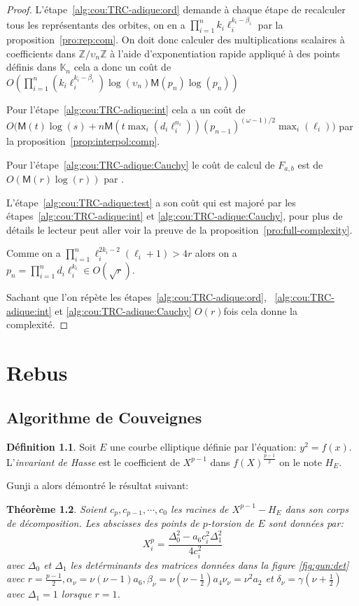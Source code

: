 \documentclass[10pt,a4paper]{book}
\theoremstyle{plain}
\newtheorem{thm}{Théorème}[chapter]
\theoremstyle{definition}
\theoremstyle{definition}
\theoremstyle{definition}
\theoremstyle{definition}
\newtheorem{defi}[thm]{Définition}
\theoremstyle{remark}
\theoremstyle{remark}
\theoremstyle{definition}
\begin{document}
\begin{proof}
L'étape~\ref{alg:cou:TRC-adique:ord} demande à chaque étape de recalculer tous les 
représentants des orbites, on en a $\prod_{i=1}^n k_i\ell_i^{k_i-\beta_i}$ par
la proposition~\ref{pro:rep:com}. 
On doit donc calculer des multiplications scalaires à coefficients dans 
$\mathbb{Z}/\upsilon_n \mathbb{Z}$ à l'aide d'exponentiation rapide appliqué à
des points définis dans $\mathbb{K}_n$ cela a donc un coût de 
$O(\prod_{i=1}^n (k_i\ell_i^{k_i-\beta_i})\log(\upsilon_n) \mathsf{M}(p_n)\log(p_n))$

Pour l'étape~\ref{alg:cou:TRC-adique:int} cela a un coût de 
$O\bigl(\mathsf{M}(t)\log(s) + n\mathsf{M}(t \max_i(d_i\ell_i^{n_i}))(p_{n-1})^{(\omega-1)/2} \max_{i}(\ell_{i})\bigr)$ 
 par la proposition~\ref{prop:interpol:comp}.

Pour l'étape~\ref{alg:cou:TRC-adique:Cauchy} le coût de calcul de $F_{a,b}$ est de 
$O(\mathsf{M}(r)\log(r))$ par \cite[Théorème 7.5]{algeff17}.

L'étape~\ref{alg:cou:TRC-adique:test} a son coût qui est majoré par les 
étapes~\ref{alg:cou:TRC-adique:int} et \ref{alg:cou:TRC-adique:Cauchy}, pour plus de 
détails le lecteur peut aller voir la preuve de la 
proposition~\ref{pro:full-complexity}.

Comme on a $\prod_{i=1}^n\ell_{i}^{2k_{i}-2}(\ell_{i}+1)>4r$ alors on a 
$p_n=\prod_{i=1}^nd_i\ell_i^{k_i} \in O(\sqrt{r})$. 

Sachant que l'on répète les étapes~\ref{alg:cou:TRC-adique:ord}, 
~\ref{alg:cou:TRC-adique:int} et \ref{alg:cou:TRC-adique:Cauchy}  $O(r)$fois cela donne la 
complexité.
\end{proof}

\chapter{Rebus}
\section{Algorithme de Couveignes}

\begin{defi}
Soit $E$ une courbe elliptique définie par l'équation: $y^2=f(x)$. L'\emph{invariant de Hasse} est le coefficient de $X^{p-1}$ dans $f(X)^{\frac{p-1}{2}}$ on le note $H_{E}$.
\end{defi}

Gunji a alors démontré le résultat suivant:

\begin{thm}
\label{thm:Gunji}
Soient $c_p, c_{p-1}, \cdots, c_{0}$ les racines de $X^{p-1}-H_{E}$ dans son corps de décomposition. Les abscisses des points de $p$-torsion de $E$ sont données par: 
\begin{equation*}
X^{p}_i=\frac{\Delta_0^2-a_6c_i^2\Delta_1^2}{4c_i^2}
\end{equation*}
avec $\Delta_0$ et $\Delta_1$ les detérminants des matrices données dans la figure \ref{fig:gun:det} avec $r=\frac{p-1}{2}, \alpha_{\nu}=\nu (\nu -1 ) a_6, \beta_{\nu}=\nu(\nu-\frac{1}{2})a_4 \nu_{\nu}=\nu^2a_2$ et $\delta_{\nu}=\gamma(\nu + \frac{1}{2})$ avec $\Delta_1=1$ lorsque $r=1$.
\end{thm}
\end{document}
